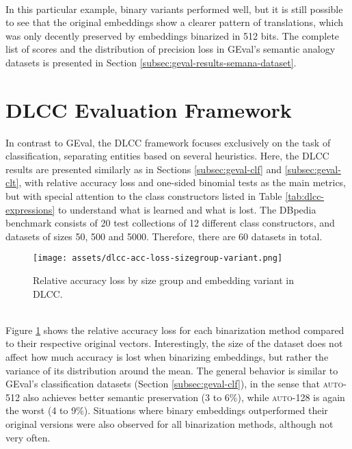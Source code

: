 \documentclass[11pt,titlepage,oneside,openany]{book}
\begin{document}
\\
In this particular example, binary variants performed well, but it is still possible to see that the original embeddings show a clearer pattern of translations, which was only decently preserved by embeddings binarized in 512 bits. The complete list of scores and the distribution of precision loss in GEval's semantic analogy datasets is presented in Section \ref{subsec:geval-results-semana-dataset}.

\newpage

\section{DLCC Evaluation Framework}
\label{sec:dlcc}

In contrast to GEval, the DLCC framework focuses exclusively on the task of classification, separating entities based on several heuristics. Here, the DLCC results are presented similarly as in Sections \ref{subsec:geval-clf} and \ref{subsec:geval-clt}, with relative accuracy loss and one-sided binomial tests as the main metrics, but with special attention to the class constructors listed in Table \ref{tab:dlcc-expressions} to understand what is learned and what is lost. The DBpedia benchmark consists of 20 test collections of 12 different class constructors, and datasets of sizes 50, 500 and 5000. Therefore, there are 60 datasets in total.\\
\begin{figure}[h!]
    \centering
    \centerline{\texttt{[image: assets/dlcc-acc-loss-sizegroup-variant.png]}}
    \vspace*{-3mm}
    \caption{Relative accuracy loss by size group and embedding variant in DLCC.}
    \label{fig:dlcc-acc-loss-sizegroup-variant}
\end{figure}
\\
Figure \ref{fig:dlcc-acc-loss-sizegroup-variant} shows the relative accuracy loss for each binarization method compared to their respective original vectors. Interestingly, the size of the dataset does not affect how much accuracy is lost when binarizing embeddings, but rather the variance of its distribution around the mean. The general behavior is similar to GEval's classification datasets (Section \ref{subsec:geval-clf}), in the sense that \textsc{auto-512} also achieves better semantic preservation (3 to 6\%), while \textsc{auto-128} is again the worst (4 to 9\%). Situations where binary embeddings outperformed their original versions were also observed for all binarization methods, although not very often.\\
\end{document}
